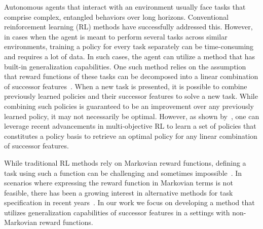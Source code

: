 Autonomous agents that interact with an environment usually face tasks  that comprise complex, entangled behaviors over long horizons. Conventional reinforcement learning (RL) methods have successfully addressed this.  However, in cases when the agent is meant to perform several tasks across similar environments, training a policy for every task separately can be time-consuming and requires a lot of data. In such cases, the agent can utilize a method that has built-in generalization capabilities. One such method relies on the assumption that reward functions of these tasks can be decomposed into a linear combination of successor features~\citep{Barreto2017}. When a new task is presented, it is possible to combine previously learned policies and their successor features to solve a new task. %
While combining such policies is guaranteed to be an improvement over any previously learned policy, it may not necessarily be optimal. 
However, as shown by~\citep{Alegre2022}, %
one can leverage recent advancements in multi-objective RL to learn a set of policies that constitutes a policy basis to retrieve an optimal policy for any linear combination of successor features. 

While traditional RL methods rely on Markovian reward functions, defining a task using such a function can be challenging and sometimes impossible~\citep{Whitehead1995}. In scenarios where expressing the reward function in Markovian terms is not feasible, there has been a growing interest in alternative methods for task specification in recent years~\citep{Icarte2022, Camacho2019}. 
In our work we focus on developing a method that utilizes generalization capabilities of successor features in a settings with non-Markovian reward functions.

